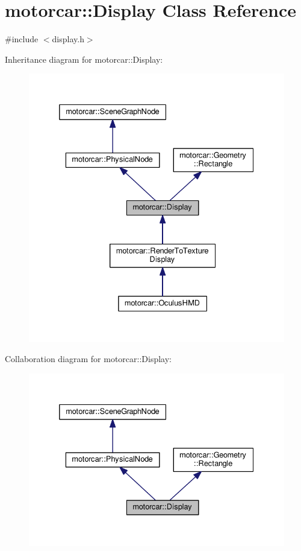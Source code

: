 \hypertarget{classmotorcar_1_1Display}{\section{motorcar\-:\-:Display Class Reference}
\label{classmotorcar_1_1Display}
}


{\ttfamily \#include $<$display.\-h$>$}



Inheritance diagram for motorcar\-:\-:Display\-:
\nopagebreak
\begin{figure}[H]
\begin{center}
\leavevmode
\includegraphics[width=332pt]{classmotorcar_1_1Display__inherit__graph}
\end{center}
\end{figure}


Collaboration diagram for motorcar\-:\-:Display\-:
\nopagebreak
\begin{figure}[H]
\begin{center}
\leavevmode
\includegraphics[width=332pt]{classmotorcar_1_1Display__coll__graph}
\end{center}
\end{figure}
